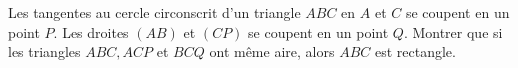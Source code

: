 Les tangentes au cercle circonscrit d'un triangle $ABC$ en $A$ et $C$ se coupent en un point $P$. Les droites $(AB)$ et $(CP)$ se coupent en un point $Q$. Montrer que si les triangles $ABC, ACP$ et $BCQ$ ont même aire, alors $ABC$ est rectangle.
